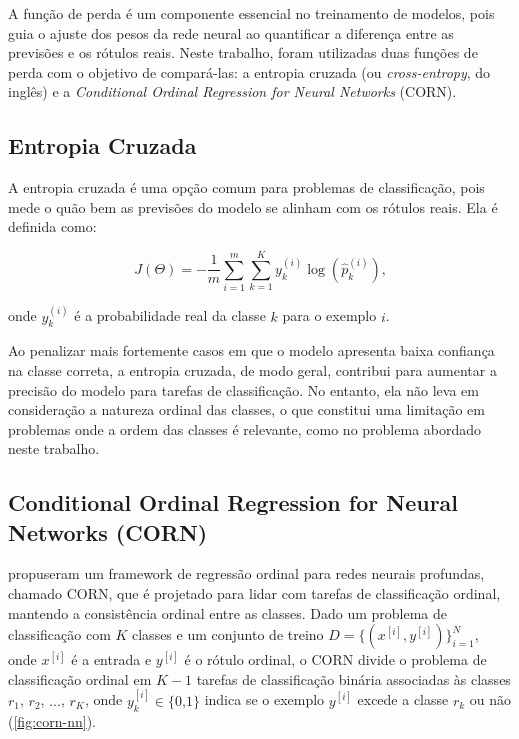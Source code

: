 A função de perda é um componente essencial no treinamento de modelos, pois guia o ajuste dos pesos da rede neural ao quantificar a diferença entre as previsões e os rótulos reais. Neste trabalho, foram utilizadas duas funções de perda com o objetivo de compará-las: a entropia cruzada (ou \textit{cross-entropy}, do inglês) e a \textit{Conditional Ordinal Regression for Neural Networks} (CORN).

\subsection{Entropia Cruzada}

A entropia cruzada é uma opção comum para problemas de classificação, pois mede o quão bem as previsões do modelo se alinham com os rótulos reais. Ela é definida como:

\begin{equation}
    J(\Theta) = -\frac{1}{m} \sum_{i=1}^{m} \sum_{k=1}^{K} y_{k}^{(i)} \log(\hat{p}_k^{(i)}) \text{,}
\end{equation}

onde $y_{k}^{(i)}$ é a probabilidade real da classe $k$ para o exemplo $i$.

Ao penalizar mais fortemente casos em que o modelo apresenta baixa confiança na classe correta, a entropia cruzada, de modo geral, contribui para aumentar a precisão do modelo para tarefas de classificação. No entanto, ela não leva em consideração a natureza ordinal das classes, o que constitui uma limitação em problemas onde a ordem das classes é relevante, como no problema abordado neste trabalho.

\subsection{Conditional Ordinal Regression for Neural Networks (CORN)}

 propuseram um framework de regressão ordinal para redes neurais profundas, chamado CORN, que é projetado para lidar com tarefas de classificação ordinal, mantendo a consistência ordinal entre as classes. Dado um problema de classificação com $K$ classes e um conjunto de treino $D = \{(x^{[i]}, y^{[i]})\}_{i=1}^{N}$, onde $x^{[i]}$ é a entrada e $y^{[i]}$ é o rótulo ordinal, o CORN divide o problema de classificação ordinal em $K-1$ tarefas de classificação binária associadas às classes $r_1$, $r_2$, $...$, $r_K$, onde $y_{k}^{[i]} \in \lbrace 0 \text{,} 1 \rbrace$ indica se o exemplo $y^{[i]}$ excede a classe $r_k$ ou não (\autoref{fig:corn-nn}).

